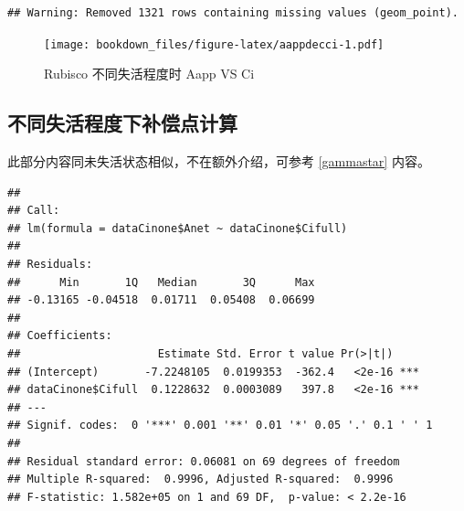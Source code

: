 \documentclass[
]{krantz}
\makeatletter
\newenvironment{Shaded}{\begin{snugshade}}{\end{snugshade}}
\newcommand{\CommentTok}[1]{\textcolor[rgb]{0.56,0.35,0.01}{\textit{#1}}}
\newcommand{\DecValTok}[1]{\textcolor[rgb]{0.00,0.00,0.81}{#1}}
\newcommand{\FunctionTok}[1]{\textcolor[rgb]{0.00,0.00,0.00}{#1}}
\newcommand{\NormalTok}[1]{#1}
\newcommand{\OtherTok}[1]{\textcolor[rgb]{0.56,0.35,0.01}{#1}}
\newcommand{\SpecialCharTok}[1]{\textcolor[rgb]{0.00,0.00,0.00}{#1}}
\newcommand{\StringTok}[1]{\textcolor[rgb]{0.31,0.60,0.02}{#1}}
\newenvironment{kframe}{%
\medskip{}
\setlength{\fboxsep}{.8em}
 \def\at@end@of@kframe{}%
 \ifinner\ifhmode%
  \def\at@end@of@kframe{\end{minipage}}%
  \begin{minipage}{\columnwidth}%
 \fi\fi%
 \def\FrameCommand##1{\hskip\@totalleftmargin \hskip-\fboxsep
 \colorbox{shadecolor}{##1}\hskip-\fboxsep
     \hskip-\linewidth \hskip-\@totalleftmargin \hskip\columnwidth}%
 \MakeFramed {\advance\hsize-\width
   \@totalleftmargin\z@ \linewidth\hsize
   \@setminipage}}%
 {\par\unskip\endMakeFramed%
 \at@end@of@kframe}
\renewenvironment{Shaded}{\begin{kframe}}{\end{kframe}}
\makeatother
\begin{document}
\begin{verbatim}
## Warning: Removed 1321 rows containing missing values (geom_point).
\end{verbatim}

\begin{figure}
\centering
\texttt{[image: bookdown\_files/figure-latex/aappdecci-1.pdf]}
\caption{\label{fig:aappdecci}Rubisco 不同失活程度时 Aapp VS Ci}
\end{figure}

\hypertarget{multi10}{%
\subsection{不同失活程度下补偿点计算}\label{multi10}}

此部分内容同未失活状态相似，不在额外介绍，可参考 \ref{gammastar} 内容。

\begin{Shaded}
\end{Shaded}

\begin{verbatim}
## 
## Call:
## lm(formula = dataCinone$Anet ~ dataCinone$Cifull)
## 
## Residuals:
##      Min       1Q   Median       3Q      Max 
## -0.13165 -0.04518  0.01711  0.05408  0.06699 
## 
## Coefficients:
##                     Estimate Std. Error t value Pr(>|t|)    
## (Intercept)       -7.2248105  0.0199353  -362.4   <2e-16 ***
## dataCinone$Cifull  0.1228632  0.0003089   397.8   <2e-16 ***
## ---
## Signif. codes:  0 '***' 0.001 '**' 0.01 '*' 0.05 '.' 0.1 ' ' 1
## 
## Residual standard error: 0.06081 on 69 degrees of freedom
## Multiple R-squared:  0.9996, Adjusted R-squared:  0.9996 
## F-statistic: 1.582e+05 on 1 and 69 DF,  p-value: < 2.2e-16
\end{verbatim}
\end{document}
